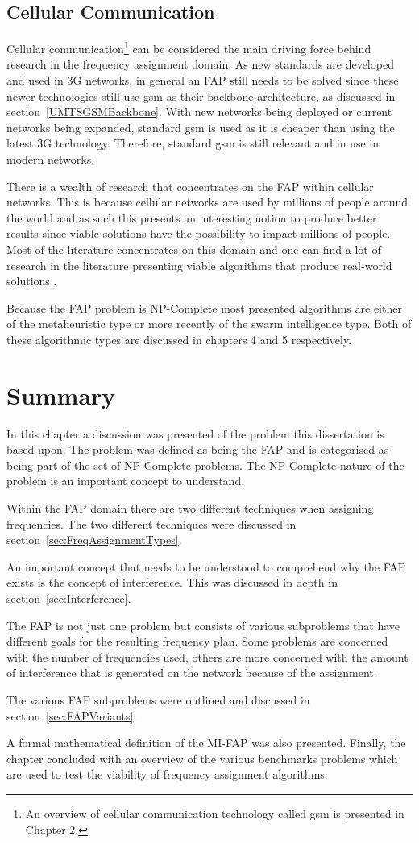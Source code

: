\subsection{Cellular Communication}
Cellular communication\footnote{An overview of cellular communication technology called \gls{gsm} is presented in Chapter 2.} can be considered the main driving force behind research in the frequency assignment domain. As new standards are developed and used in 3G networks, in general an \gls{FAP} still needs to be solved since these newer technologies still use \gls{gsm} as their backbone architecture, as discussed in section~\ref{UMTSGSMBackbone}. With new networks being deployed or current networks being expanded, standard \gls{gsm} is used as it is cheaper than using the latest 3G technology. Therefore, standard \gls{gsm} is still relevant and in use in modern networks.

There is a wealth of research that concentrates on the \gls{FAP} within cellular networks. This is because cellular networks are used by millions of people around the world and as such this presents an interesting notion to produce better results since viable solutions have the possibility to impact millions of people. Most of the literature concentrates on this domain and one can find a lot of research in the literature presenting viable algorithms that produce real-world solutions \cite{Eisenblatter}. 

Because the \gls{FAP} problem is NP-Complete most presented algorithms are either of the metaheuristic type or more recently of the swarm intelligence type. Both of these algorithmic types are discussed in chapters 4 and 5 respectively.
\section{Summary}
In this chapter a discussion was presented of the problem this dissertation is based upon. The problem was defined as being the \gls{FAP} and is categorised as being part of the set of NP-Complete problems. The NP-Complete nature of the problem is an important concept to understand.

Within the \gls{FAP} domain there are two different techniques when assigning frequencies. The two different techniques were discussed in section~\ref{sec:FreqAssignmentTypes}. 

An important concept that needs to be understood to comprehend why the \gls{FAP} exists is the concept of interference. This was discussed in depth in section~\ref{sec:Interference}.

The \gls{FAP} is not just one problem but consists of various subproblems that have different goals for the resulting frequency plan. Some problems are concerned with the number of frequencies used, others are more concerned with the amount of interference that is generated on the network because of the assignment.

The various \gls{FAP} subproblems were outlined and discussed in section~\ref{sec:FAPVariants}.

A formal mathematical definition of the \gls{MI-FAP} was also presented. Finally, the chapter concluded with an overview of the various benchmarks problems which are used to test the viability of frequency assignment algorithms.
